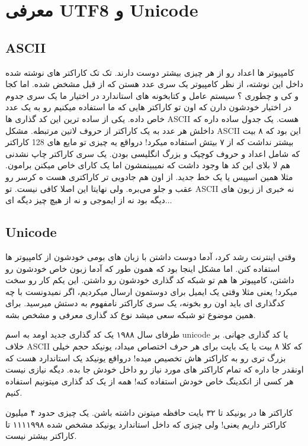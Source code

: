 \section{معرفی UTF8 و Unicode}

\subsection{ASCII}

کامپیوتر ها اعداد رو از هر چیزی بیشتر دوست دارند. تک تک کاراکتر های نوشته شده داخل این نوشته، از نظر کامپیوتر یک سری عدد هستن که از قبل مشخض شده. اما کجا و کی و چطوری ؟
سیستم عامل و کتابخونه های استاندارد در اختیار ما یک سری جدوم در اختیار خودشون دارن که اون تو کاراکتر هایی که ما استفاده میکنیم رو به یک عدد خاص داده.
یکی از ساده ترین این کد گذاری ها ASCII هست. یک جدول ساده داره که داخلش هر عدد به یک کاراکتر از حروف لاتین مرتبطه.
مشکل ASCII این بود که ۸ بیت بیشتر نداشت که از ۷ بیتش استفاده میکرد! درواقع یه چیزی تو مایع های 128 کاراکتر که شامل اعداد و حروف کوچیک و بزرگ انگلیسی بودن.
یک سری کاراکتر چاپ نشدنی هم لا بلای این کد ها وجود داشت که نمیبینمشون اما یک کارای خاص میکنن برامون. مثلا همین اسپیس یا یک خط جدید. از اون هم جادویی تر کاراکتری هست ه کرسر رو عقب و جلو می‌بره.
ولی نهایتا این اصلا کافی نیست. تو ASCII نه خبری از زبون های دیگه بود نه از ایموجی و نه از هیچ چیز دیگه ای...

\subsection{Unicode}

وقتی اینترنت رشد کرد، آدما دوست داشتن با زبان های بومی خودشون از کامپیوتر ها استفاده کنن. اما مشکل اینجا بود که همون طور که آدما زبون خاص خودشون رو داشتن، کامپیوتر ها هم تو شبکه کد گذاری خودشون رو داشتن.
این یکم کار رو سخت میکرد! یعنی مثلا وقتی یک ایمیل برای دوستمون ارسال میکردیم، اگر نمیدونست با چه کدگذاری ای باید اون رو بخونه، یک سری کاراکتر نامفهوم به دستش میرسید.
برای همین موضوع تو شبکه سعی میشد نوع کد گذاری معرفی و مشخص بشه.

طرفای سال ۱۹۸۸ یک کد گذاری جدید اومد به اسم unicode یا کد گذاری جهانی. بر خلاف ASCII که کلا ۸ بیت یا یک بایت برای هر حرف اختصاص میداد، یونیکد حجم خیلی بزرگ تری رو به کاراکتر هاش تخصیص میده!
درواقع یونیکد یک استاندارد هست که اونقدر جا داره که تمام کاراکتر های مورد نیاز رو داخل خودش جا بده. دیگه نیازی نیست هر کسی از انکدینگ خاص خودش استفاده کنه! همه از یک کد گذاری میتونیم استفاده کنیم.

کاراکتر ها در یونیکد تا ۳۲ بایت حافظه میتونن داشته باشن. یک چیزی حدود ۴ میلیون کاراکتر داریم یعنی! ولی چیزی که داخل استاندارد یونیکد مشخص شده ۱۱۱۱۹۹۸ تا کاراکتر بیشتر نیست.

